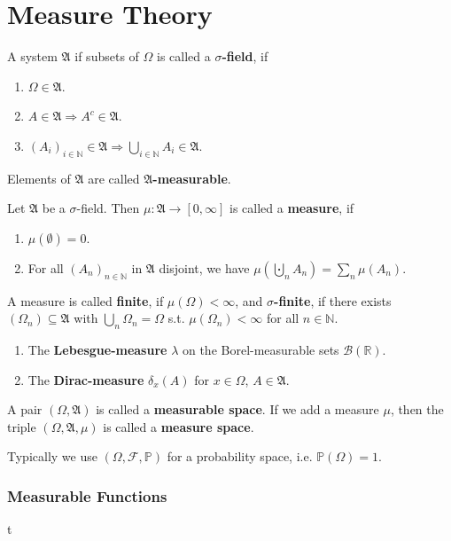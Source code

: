 \chapter{Measure Theory}

\begin{defi}
A system $\mathfrak A$ if subsets of $\Omega$ is called a \textbf{ $\sigma$-field}, if 
\begin{enumerate}
    \item $\Omega\in \mathfrak A$.
    \item $A\in\mathfrak A\Rightarrow A^c\in\mathfrak A$.
    \item $(A_i)_{i\in\mathbb N}\in\mathfrak A\Rightarrow \bigcup_{i\in\mathbb N}A_i\in\mathfrak A$.
\end{enumerate}
Elements of $\mathfrak A$ are called \textbf{$\mathfrak A$-measurable}.
\end{defi}

\begin{defi}
Let $\mathfrak A$ be a $\sigma$-field. Then $\mu\colon\mathfrak A\to [0,\infty]$ is called a \textbf{measure}, if 
\begin{enumerate}
    \item $\mu(\emptyset)=0$.
    \item For all $(A_n)_{n\in\mathbb N}$ in $\mathfrak A$ disjoint, we have $\mu(\bigcupdot_n A_n)=\sum_n \mu(A_n)$.
\end{enumerate}
A measure is called \textbf{finite}, if $\mu(\Omega)<\infty$, and \textbf{$\sigma$-finite}, if there exists $(\Omega_n)\subseteq \mathfrak A$ with $\bigcup_n \Omega_n=\Omega$ s.t. $\mu(\Omega_n)<\infty$ for all $n\in\mathbb N$.
\end{defi}

\begin{ex}
\begin{enumerate}
    \item The \textbf{Lebesgue-measure} $\lambda$ on the Borel-measurable sets $\mathcal B(\mathbb R)$.
    \item The \textbf{Dirac-measure} $\delta_x(A)$ for $x\in\Omega$, $A\in\mathfrak A$.
\end{enumerate}
\end{ex}

\begin{defi}
A pair $(\Omega, \mathfrak A)$ is called a \textbf{measurable space}. If we add a measure $\mu$, then the triple $(\Omega, \mathfrak A, \mu)$ is called a \textbf{measure space}.
\end{defi}

\begin{rem}
Typically we use $(\Omega, \mathcal F, \mathbb P)$ for a probability space, i.e. $\mathbb P(\Omega)=1$.
\end{rem}

\subsection{Measurable Functions}

\begin{defi}
t   
\end{defi}